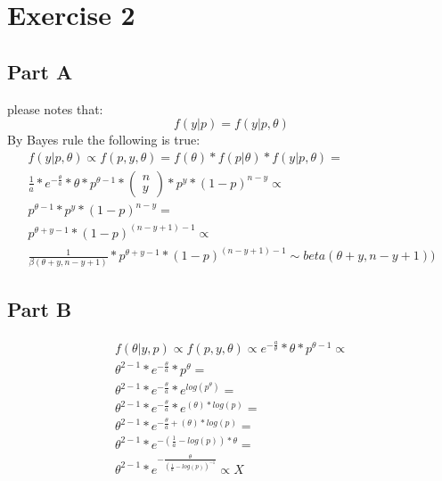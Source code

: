 \documentclass{article}\usepackage[]{graphicx}\usepackage[]{color}
\begin{document}
\section*{Exercise 2}
\subsection*{Part A}
please notes that:
\begin{equation}
f(y|p) = f(y|p,\theta)
\end{equation}
By Bayes rule the following is true:
\begin{equation}
\begin{split}
f(y|p,\theta) \propto f(p,y,\theta) = f(\theta)*f(p|\theta)*f(y|p,\theta) = \\
\frac{1}{a}*e^{-\frac{\theta}{a}}*\theta*p^{\theta-1}*\left(\begin{array}{c}
n\\
y
\end{array}\right)*p^{y}*(1-p)^{n-y} \propto \\
p^{\theta-1}*p^{y}*(1-p)^{n-y} = \\
p^{\theta+y-1}*(1-p)^{(n-y+1)-1} \propto \\
\frac{1}{\beta(\theta+y,n-y+1)}*p^{\theta+y-1}*(1-p)^{(n-y+1)-1} \sim beta(\theta+y,n-y+1))
\end{split}
\end{equation}

\subsection*{Part B}
\begin{equation}
\begin{split}
f(\theta| y,p) \propto f(p,y,\theta) \propto e^{-\frac{a}{\theta}}*\theta*p^{\theta-1}  \propto\\
\theta^{2-1}*e^{-\frac{\theta}{a}}*p^{\theta} = \\
\theta^{2-1}*e^{-\frac{\theta}{a}}*e^{log(p^{\theta})} = \\
\theta^{2-1}*e^{-\frac{\theta}{a}}*e^{(\theta)*log(p)} = \\
\theta^{2-1}*e^{-\frac{\theta}{a}+(\theta)*log(p)} = \\
\theta^{2-1}*e^{-(\frac{1}{a}-log(p))*\theta} = \\
\theta^{2-1}*e^{-\frac{\theta}{(\frac{1}{a}-log(p))^{-1}}} \propto X
\end{split}
\end{equation}
\end{document}
